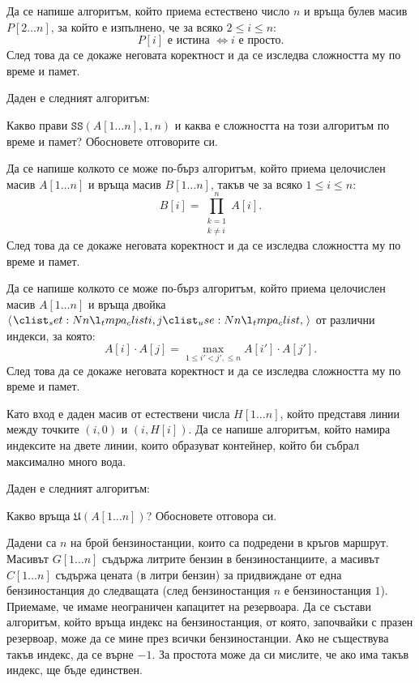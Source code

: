 \begin{problem}
Да се напише алгоритъм, който приема естествено число $n$ и връща булев масив $P[2 \dots n]$, за който е изпълнено, че за всяко $2 \leq i \leq n$:
\[
    P[i] \text{ е истина } \iff i \text{ е просто}.
\]
След това да се докаже неговата коректност и да се изследва сложността му по време и памет.
\end{problem}

\begin{problem}
Даден е следният алгоритъм:

Какво прави $\mathtt{SS}(A[1 \dots n], 1, n)$ и каква е сложността на този алгоритъм по време и памет?
Обосновете отговорите си.
\end{problem}

\begin{problem}
Да се напише колкото се може по-бърз алгоритъм, който приема целочислен масив $A[1 \dots n]$ и връща масив $B[1 \dots n]$, такъв че за всяко $1 \leq i \leq n$:
\[
    B[i] = \prod\limits_{\substack{k = 1 \\ k \neq i}}^n A[i].
\]
След това да се докаже неговата коректност и да се изследва сложността му по време и памет.
\end{problem}

\begin{problem}
Да се напише колкото се може по-бърз алгоритъм, който приема целочислен масив $A[1 \dots n]$ и връща двойка $\opair{i, j}$ от различни индекси, за която:
\[
    A[i] \cdot A[j] = \max\limits_{1 \leq i' < j', \leq n} A[i'] \cdot A[j'].
\]
След това да се докаже неговата коректност и да се изследва сложността му по време и памет.
\end{problem}

\begin{problem}
Като вход е даден масив от естествени числа $H[1 \dots n]$, който представя линии между точките $(i, 0)$ и $(i, H[i])$.
Да се напише алгоритъм, който намира индексите на двете линии, които образуват контейнер, който би събрал максимално много вода.
\end{problem}

\newpage

\begin{problem}
Даден е следният алгоритъм:

Какво връща $\mathfrak{U}(A[1 \dots n])$?
Обосновете отговора си.
\end{problem}

\begin{problem}
Дадени са $n$ на брой бензиностанции, които са подредени в кръгов маршрут.
Масивът $G[1 \dots n]$ съдържа литрите бензин в бензиностанциите, а масивът $C[1 \dots n]$ съдържа цената (в литри бензин) за придвиждане от една бензиностанция до следващата (след бензиностанция $n$ е бензиностанция $1$).
Приемаме, че имаме неограничен капацитет на резервоара.
Да се състави алгоритъм, който връща индекс на бензиностанция, от която, започвайки с празен резервоар, може да се мине през всички бензиностанции.
Ако не съществува такъв индекс, да се върне $-1$.
За простота може да си мислите, че ако има такъв индекс, ще бъде единствен.
\end{problem}